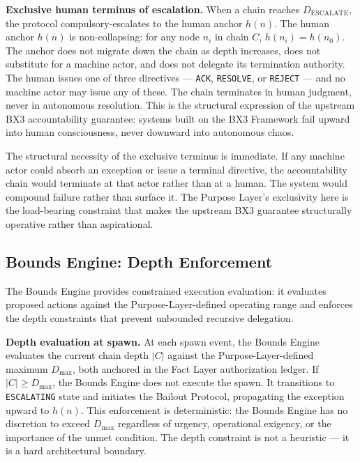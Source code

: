 \medskip
\noindent\textbf{Exclusive human terminus of escalation.} When a chain reaches $D_{\mathrm{ESCALATE}}$, the protocol compulsory-escalates to the human anchor $h(n)$. The human anchor $h(n)$ is non-collapsing: for any node $n_i$ in chain $C$, $h(n_i) = h(n_0)$. The anchor does not migrate down the chain as depth increases, does not substitute for a machine actor, and does not delegate its termination authority. The human issues one of three directives — \texttt{ACK}, \texttt{RESOLVE}, or \texttt{REJECT} — and no machine actor may issue any of these. The chain terminates in human judgment, never in autonomous resolution. This is the structural expression of the upstream BX3 accountability guarantee: systems built on the BX3 Framework fail upward into human consciousness, never downward into autonomous chaos.

The structural necessity of the exclusive terminus is immediate. If any machine actor could absorb an exception or issue a terminal directive, the accountability chain would terminate at that actor rather than at a human. The system would compound failure rather than surface it. The Purpose Layer's exclusivity here is the load-bearing constraint that makes the upstream BX3 guarantee structurally operative rather than aspirational.

\subsection{Bounds Engine: Depth Enforcement}
\label{sec:rs-bounds-depth}

The Bounds Engine provides constrained execution evaluation: it evaluates proposed actions against the Purpose-Layer-defined operating range and enforces the depth constraints that prevent unbounded recursive delegation.

\medskip
\noindent\textbf{Depth evaluation at spawn.} At each spawn event, the Bounds Engine evaluates the current chain depth $|C|$ against the Purpose-Layer-defined maximum $D_{\mathrm{max}}$, both anchored in the Fact Layer authorization ledger. If $|C| \geq D_{\mathrm{max}}$, the Bounds Engine does not execute the spawn. It transitions to \texttt{ESCALATING} state and initiates the Bailout Protocol, propagating the exception upward to $h(n)$. This enforcement is deterministic: the Bounds Engine has no discretion to exceed $D_{\mathrm{max}}$ regardless of urgency, operational exigency, or the importance of the unmet condition. The depth constraint is not a heuristic — it is a hard architectural boundary.

